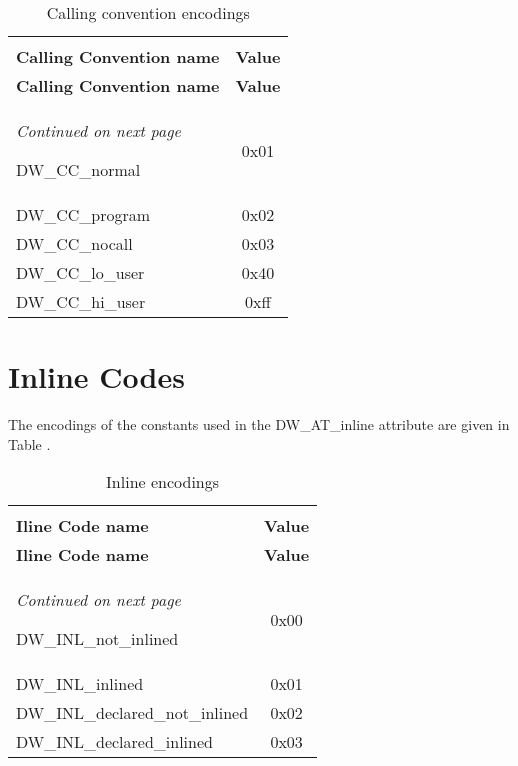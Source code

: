 \begin{centering}
\setlength{\extrarowheight}{0.1cm}
\begin{longtable}{l|c}
  \caption{Calling convention encodings} \label{tab:callingconventionencodings}\\
  \hline \\ \bfseries Calling Convention name&\bfseries Value \\ \hline
\endfirsthead
  \bfseries Calling Convention name&\bfseries Value\\ \hline
\endhead
  \hline \emph{Continued on next page}
\endfoot
  \hline
\endlastfoot

DW\-\_CC\-\_normal&0x01     \\
DW\-\_CC\-\_program&0x02     \\
DW\-\_CC\-\_nocall&0x03     \\
DW\-\_CC\-\_lo\-\_user&0x40     \\
DW\-\_CC\-\_hi\-\_user&0xff     \\

\end{longtable}
\end{centering}

\section{Inline Codes}
\label{datarep:inlinecodes}

The encodings of the constants used in the 
DW\-\_AT\-\_inline attribute are given in 
Table .

\begin{centering}
\setlength{\extrarowheight}{0.1cm}
\begin{longtable}{l|c}
  \caption{Inline encodings} \label{tab:inlineencodings}\\
  \hline \\ \bfseries Iline Code name&\bfseries Value \\ \hline
\endfirsthead
  \bfseries Iline Code name&\bfseries Value\\ \hline
\endhead
  \hline \emph{Continued on next page}
\endfoot
  \hline
\endlastfoot

DW\-\_INL\-\_not\-\_inlined&0x00      \\
DW\-\_INL\-\_inlined&0x01      \\
DW\-\_INL\-\_declared\-\_not\-\_inlined&0x02      \\
DW\-\_INL\-\_declared\-\_inlined&0x03      \\

\end{longtable}
\end{centering}

